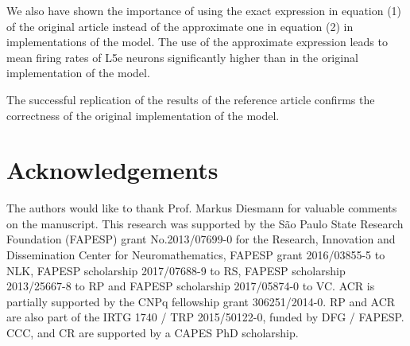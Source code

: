 \documentclass[10pt,a4paper,onecolumn]{article}
\begin{document}
We also have shown the importance of using the exact expression in equation (1) of the original article instead of the approximate one in equation (2) in implementations of the model. The use of the approximate expression leads to mean firing rates of L5e neurons significantly higher than in the original implementation of the model.  

The successful replication of the results of the reference article confirms the correctness of the original implementation of the model. 

\section{Acknowledgements}\label{acknowledgements}
The authors would like to thank Prof. Markus Diesmann for valuable comments on the manuscript. This research was supported by the S\~{a}o Paulo State Research Foundation (FAPESP) grant No.2013/07699-0 for the Research, Innovation and Dissemination Center for Neuromathematics, FAPESP grant 2016/03855-5 to NLK, FAPESP scholarship 2017/07688-9 to RS, FAPESP scholarship 2013/25667-8 to RP and FAPESP scholarship 2017/05874-0 to VC. ACR is partially supported by the CNPq fellowship grant 306251/2014-0. RP and ACR are also part of the IRTG 1740 / TRP 2015/50122-0, funded by DFG / FAPESP. CCC, and CR are supported by a CAPES PhD scholarship. 

{\sffamily \small
   \printbibliography[title=References]
}
\end{document}
